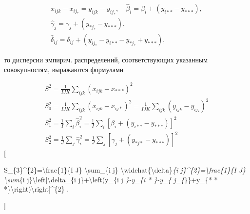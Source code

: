 \documentclass[10pt]{article}
\begin{document}
\[

\begin{gathered}

x_{i j k}-x_{i j_{*}}=y_{i j k}-y_{i j_{*}}, \quad \hat{\beta}_{i}=\beta_{i}+\left(y_{i * *}-y_{* * *}\right), \\

\hat{\gamma}_{j}=\gamma_{j}+\left(y_{* j_{*}}-y_{* * *}\right), \\

\hat{\delta}_{i j}=\delta_{i j}+\left(y_{i j_{*}}-y_{i * *}-y_{* j_{*}}+y_{* * *}\right),

\end{gathered}

\]



то дисперсии эмпирич. распределений, соответствующих указанным совокупностям, выражаются формулами



\[

\begin{gathered}

S^{2}=\frac{1}{I J K} \sum_{i j k}\left(x_{i j k}-x_{* * *}\right)^{2} \\

S_{0}^{2}=\frac{1}{I J K} \sum_{i j k}\left(x_{i j k}-x_{i j *}\right)^{2}=\frac{1}{I J K} \sum_{i j k}\left(y_{i j k}-y_{i j_{*}}\right)^{2} \\

S_{1}^{2}=\frac{1}{I} \sum_{i} \hat{\beta}_{i}^{2}=\frac{1}{I} \sum_{i}\left[\beta_{i}+\left(y_{i * *}-y_{* * *}\right)\right]^{2} \\

S_{2}^{2}=\frac{1}{J} \sum_{j} \hat{\gamma}_{i}^{2}=\frac{1}{J} \sum_{j}\left[\gamma_{j}+\left(y_{* j *}-y_{* * *}\right)\right]^{2}

\end{gathered}

\][



S\_\{3\}\^{}\{2\}=\textbackslash frac\{1\}\{I J\} \textbackslash sum\_\{i j\} \textbackslash widehat\{\textbackslash delta\}\textit{\{i j\}\^{}\{2\}=\textbackslash frac\{1\}\{I J\} \textbackslash sum}\{i j\}\textbackslash left[\textbackslash delta\_\{i j\}+\textbackslash left(y\_\{i j \textit{\}-y\_\{i * \textit{\}-y\_\{} j\_\{}\}\}+y\_\{* * *\}\textbackslash right)\textbackslash right]\^{}\{2\} .

]
\end{document}
